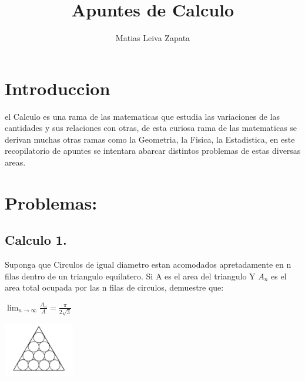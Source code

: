 \documentclass{article}
\title{\textbf{Apuntes de Calculo}}
\author{Matias Leiva Zapata}
\theoremstyle{mytheoremstyle}
\theoremstyle{mytheoremstyle}
\theoremstyle{myproblemstyle}
\begin{document}
\maketitle

\section{Introduccion}
el Calculo es una rama de las matematicas que estudia las variaciones de las cantidades y sus relaciones con otras,
de esta curiosa rama de las matematicas se derivan muchas otras ramas como la Geometria, la Fisica, la Estadistica,
en este recopilatorio de apuntes se intentara abarcar distintos problemas de estas diversas areas.

\section{Problemas:}

\subsection{Calculo 1.}
\begin{problem}

Suponga que Circulos de igual diametro estan acomodados apretadamente en n filas dentro de un triangulo equilatero.
Si A es el area del triangulo Y $A_n$ es el area total ocupada por las n filas de circulos, demuestre que:

\begin{center}

    $ \displaystyle\lim_{n \to \infty}   \frac{A_n}{A} = \frac{\pi}{2\sqrt{3}}$

    \includegraphics[width=0.23\textwidth,height = 0.2\textwidth]{Triangulo_problema2.2.png}

\end{center}

\end{problem}
\end{document}
